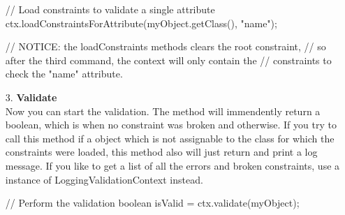 \begin{itemize}
\begin{example}[style=java, title={Three different ways to load constraints}]
	// Load constraints to validate a single attribute
	ctx.loadConstraintsForAttribute(myObject.getClass(), "name");
	
	// NOTICE: the loadConstraints methods clears the root constraint,
	// so after the third command, the context will only contain the 
	// constraints to check the "name" attribute.
\end{example}
\item[3.] \textbf{Validate} \\
Now you can start the validation. The method  will immendently return a boolean, which is  when no constraint was broken and  otherwise. If you try to call this method if a object which is not assignable to the class for which the constraints were loaded, this method also will just return  and print a log message. If you like to get a list of all the errors and broken constraints, use a instance of LoggingValidationContext instead.
\begin{example}[style=java, title={Validate}]
	// Perform the validation
	boolean isValid = ctx.validate(myObject);
\end{example}
\end{itemize}

